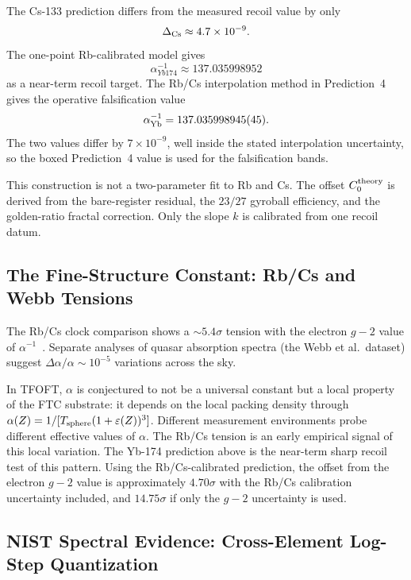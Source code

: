 \documentclass[11pt,a4paper]{article}
\begin{document}
    The Cs-133 prediction differs from the measured recoil value by only
    \begin{equation}
    \Delta_{\rm Cs} \approx 4.7\times10^{-9}.
    \end{equation}
    The one-point Rb-calibrated model gives
    \begin{equation}
    \boxed{
    \alpha_{Yb174}^{-1} \approx 137.035998952
    }
    \end{equation}
    as a near-term recoil target. The Rb/Cs interpolation method in Prediction~4 gives the operative falsification value
    \[
    \alpha^{-1}_{\rm Yb}=137.035998945(45).
    \]
    The two values differ by \(7\times10^{-9}\), well inside the stated interpolation uncertainty, so the boxed Prediction~4 value is used for the falsification bands.

    This construction is not a two-parameter fit to Rb and Cs. The offset \(C_0^{\rm theory}\) is derived from the bare-register residual, the \(23/27\) gyroball efficiency, and the golden-ratio fractal correction. Only the slope \(k\) is calibrated from one recoil datum.

  \subsection{The Fine-Structure Constant: Rb/Cs and Webb Tensions}

    The Rb/Cs clock comparison shows a $\sim5.4\sigma$ tension with the electron $g-2$ value of $\alpha^{-1}$~\cite{Guena2012}. Separate analyses of quasar absorption spectra (the Webb et al.\ dataset) suggest $\Delta\alpha/\alpha \sim 10^{-5}$ variations across the sky.

    In TFOFT, $\alpha$ is conjectured to not be a universal constant but a local property of the FTC substrate: it depends on the local packing density through $\alpha(Z) = 1/[T_{\rm sphere}(1+\varepsilon(Z))^3]$. Different measurement environments probe different effective values of $\alpha$. The Rb/Cs tension is an early empirical signal of this local variation. The Yb-174 prediction above is the near-term sharp recoil test of this pattern. Using the Rb/Cs-calibrated prediction, the offset from the electron $g-2$ value is approximately $4.70\sigma$ with the Rb/Cs calibration uncertainty included, and $14.75\sigma$ if only the $g-2$ uncertainty is used.

  \subsection{NIST Spectral Evidence: Cross-Element Log-Step Quantization}
\end{document}
